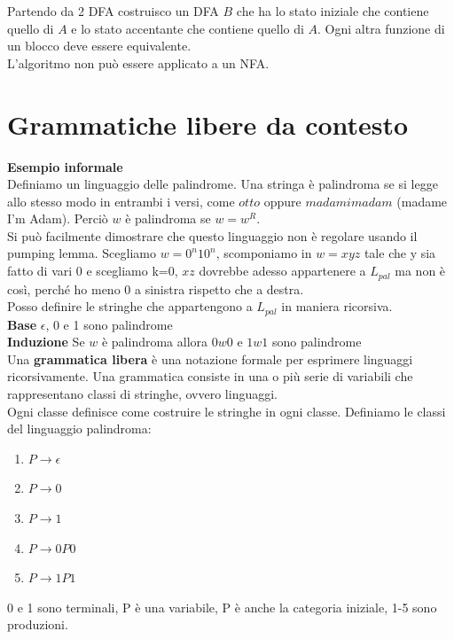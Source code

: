 \documentclass[12pt]{article}
\begin{document}
Partendo da 2 DFA costruisco un DFA $B$ che ha lo stato iniziale che contiene quello di $A$ e lo stato accentante che contiene quello di $A$. Ogni altra funzione di un blocco deve essere equivalente.
\\ L'algoritmo non può essere applicato a un NFA.

\section{Grammatiche libere da contesto}
\textbf{Esempio informale}
\vspace{5mm}
\\ Definiamo un linguaggio delle palindrome. Una stringa è palindroma se si legge allo stesso modo in entrambi i versi, come $otto$ oppure $madamimadam$ (madame I'm Adam). Perciò $w$ è palindroma se $w=w^R$. 
\\ Si può facilmente dimostrare che questo linguaggio non è regolare usando il pumping lemma. Scegliamo $w=0^n10^n$, scomponiamo in $w=xyz$ tale che y sia fatto di vari 0 e scegliamo k=0, $xz$ dovrebbe adesso appartenere a $L_{pal}$ ma non è così, perché ho meno 0 a sinistra rispetto che a destra. 
\\ Posso definire le stringhe che appartengono a $L_{pal}$ in maniera ricorsiva. 
\vspace{2mm}
\\ \textbf{Base} $\epsilon$, 0 e 1 sono palindrome
\\ \textbf{Induzione} Se $w$ è palindroma allora $0w0$ e $1w1$ sono palindrome
\vspace{2mm}
\\ Una \textbf{grammatica libera} è una notazione formale per esprimere linguaggi ricorsivamente. Una grammatica consiste in una o più serie di variabili che rappresentano classi di stringhe, ovvero linguaggi.
\\ Ogni classe definisce come costruire le stringhe in ogni classe. Definiamo le classi del linguaggio palindroma:
\begin{enumerate}
  \item $P\rightarrow\epsilon$
  \item $P\rightarrow0$
  \item $P\rightarrow1$
  \item $P\rightarrow 0P0$
  \item $P\rightarrow 1P1$
\end{enumerate}
0 e 1 sono terminali, P è una variabile, P è anche la categoria iniziale, 1-5 sono produzioni.
\end{document}
